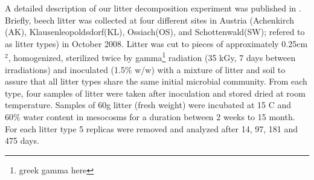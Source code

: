 \documentclass[authoryear,preprint,review,12pt]{elsarticle}
\begin{document}
                                                                                                                                                                                                                                                                                                                                                                                                                                                                                                                                                                                                                                                                                                                                                                                                                                                                                                                                                                                                                                                                                                                                                                                                                                                                                                                                                                                                                                                                                                                                        A detailed description of our litter decomposition experiment was published in \cite{Wanek2010}. Briefly, beech litter was collected at four different sites in Austria (Achenkirch (AK), Klausenleopoldsdorf(KL), Ossiach(OS), and Schottenwald(SW); refered to as litter types) in October 2008. Litter was cut to pieces of approximately 0.25cm$^2$, homogenized, sterilized twice by gamma\footnote{greek gamma here} radiation (35 kGy, 7 days between irradiations) and inoculated (1.5\% w/w) with a mixture of litter and soil to assure that all litter types share the same initial microbial community. From each type, four samples of litter were taken after inoculation and stored dried at room temperature. Samples of 60g litter (fresh weight) were incubated at 15 \textdegree C and 60\% water content in mesocosms for a duration between 2 weeks to 15 month. For each litter type 5 replicas were removed and analyzed after 14, 97, 181 and 475 days.
\end{document}
